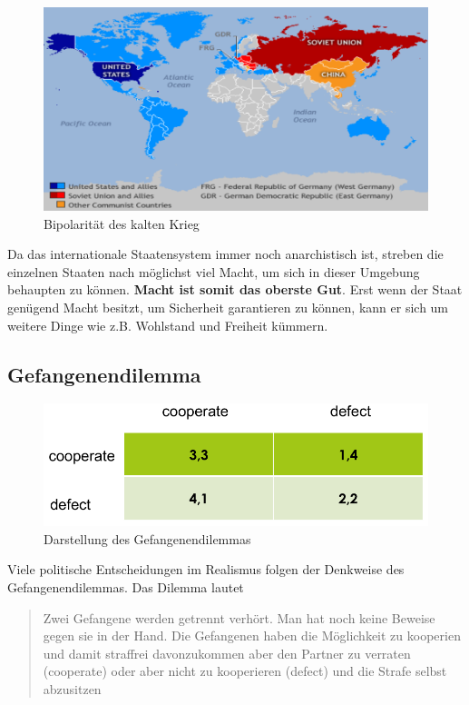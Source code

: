 \documentclass[a4paper, 11pt]{article}
\begin{document}
\begin{figure}[htb]
    \centering
    \includegraphics[keepaspectratio=true,height=15\baselineskip]{bipolaritaet.png}
    \caption{Bipolarität des kalten Krieg}
    \label{fig:bipolaritaet}
\end{figure}

Da das internationale Staatensystem immer noch anarchistisch ist, streben die einzelnen Staaten nach möglichst viel Macht, um sich in dieser Umgebung behaupten zu können. \textbf{Macht ist somit das oberste Gut}. Erst wenn der Staat genügend Macht besitzt, um Sicherheit garantieren zu können, kann er sich um weitere Dinge wie z.B. Wohlstand und Freiheit kümmern.

\subsection{Gefangenendilemma}

\begin{figure}[htb]
    \centering
    \includegraphics[keepaspectratio=true,height=10\baselineskip]{gefangenendilemma.png}
    \caption{Darstellung des Gefangenendilemmas}
    \label{fig:gefangenendilemma}
\end{figure}

Viele politische Entscheidungen im Realismus folgen der Denkweise des Gefangenendilemmas. Das Dilemma lautet

\begin{quote}
	\centering
	Zwei Gefangene werden getrennt verhört. Man hat noch keine Beweise gegen sie in der Hand. Die Gefangenen haben die Möglichkeit zu kooperien und damit straffrei davonzukommen aber den Partner zu verraten (cooperate) oder aber nicht zu kooperieren (defect) und die Strafe selbst abzusitzen 
\end{quote}
\end{document}
